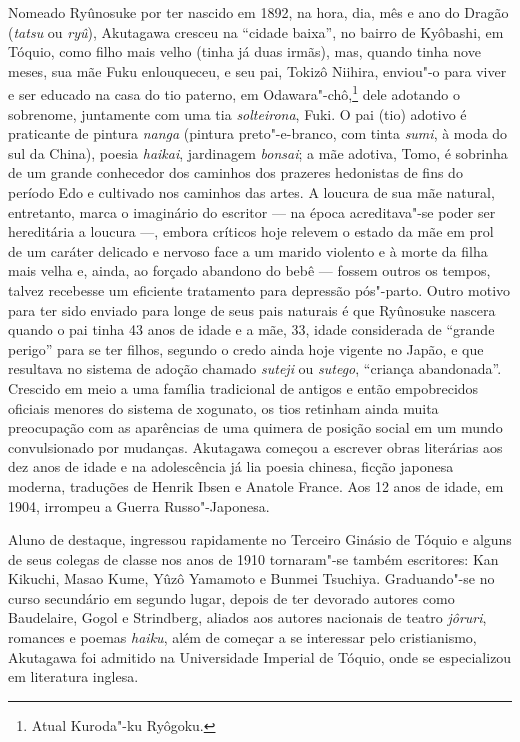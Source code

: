 Nomeado Ryûnosuke por ter nascido em 1892, na hora, dia, mês e ano do
Dragão (\textit{tatsu} ou \textit{ryû}), Akutagawa cresceu na ``cidade
baixa'', no bairro de Kyôbashi, em Tóquio, como filho mais velho
(tinha já duas irmãs), mas, quando tinha nove meses, sua mãe Fuku
enlouqueceu, e seu pai, Tokizô Niihira, enviou"-o para viver e ser
educado na casa do tio paterno, em Odawara"-chô,\footnote{Atual Kuroda"-ku
Ryôgoku.} dele adotando o sobrenome, juntamente com uma tia \textit{solteirona},
Fuki. O pai (tio) adotivo é praticante de pintura \textit{nanga} 
(pintura preto"-e-branco, com tinta \textit{sumi}, à moda do 
sul da China), poesia \textit{haikai}, jardinagem \textit{bonsai}; a
mãe adotiva, Tomo, é sobrinha de um grande conhecedor dos caminhos dos
prazeres hedonistas de fins do período Edo e cultivado nos caminhos das
artes. A loucura de sua mãe natural, entretanto, marca o imaginário do
escritor --- na época acreditava"-se poder ser hereditária a loucura ---,
embora críticos hoje relevem o estado da mãe em prol de um caráter
delicado e nervoso  face a um marido violento e à morte da filha mais
velha e, ainda, ao forçado abandono do bebê --- fossem outros os tempos,
talvez recebesse um eficiente tratamento para depressão pós"-parto.
Outro motivo para ter sido enviado para longe de seus pais naturais é
que Ryûnosuke nascera quando o pai tinha 43 anos de idade e a mãe, 33,
idade considerada de ``grande perigo'' para se ter filhos, segundo o credo 
ainda hoje vigente no Japão, e que resultava no sistema de adoção chamado \textit{suteji} ou
\textit{sutego}, ``criança abandonada''. Crescido em meio a uma família
tradicional de antigos e então empobrecidos oficiais menores do sistema
de xogunato, os tios retinham ainda muita preocupação com as aparências de
uma quimera de posição social em um mundo convulsionado por mudanças.
Akutagawa começou a escrever obras literárias aos dez anos de idade e na
adolescência já lia poesia chinesa, ficção japonesa moderna, traduções
de Henrik Ibsen e Anatole France. Aos 12 anos de idade, em 1904,
irrompeu a Guerra Russo"-Japonesa.

Aluno de destaque, ingressou rapidamente no Terceiro Ginásio de Tóquio e 
alguns de seus colegas de classe nos anos de 1910 tornaram"-se
também escritores: Kan Kikuchi, Masao Kume, Yûzô Yamamoto e Bunmei Tsuchiya. 
Graduando"-se no curso secundário em segundo lugar, depois de
ter devorado autores como Baudelaire, Gogol e Strindberg, aliados aos
autores nacionais de teatro \textit{jôruri}, romances e poemas
\textit{haiku}, além de começar a se interessar pelo cristianismo,
Akutagawa foi admitido na Universidade Imperial de Tóquio, onde se
especializou em literatura inglesa.

